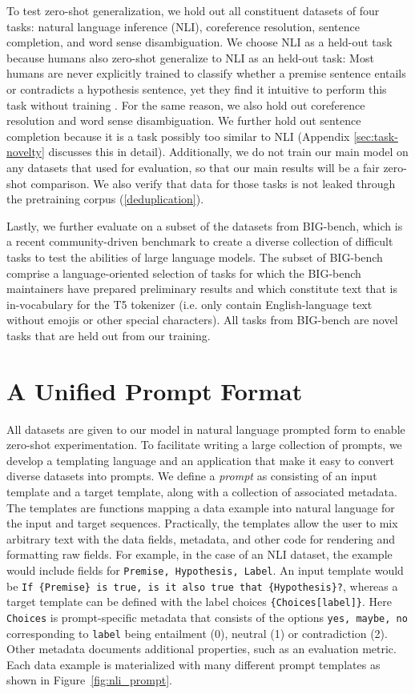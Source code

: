 To test zero-shot generalization, we hold out all constituent datasets of four tasks: natural language inference (NLI), coreference resolution, sentence completion, and word sense disambiguation. We choose NLI as a held-out task because humans also zero-shot generalize to NLI as an held-out task: Most humans are never explicitly trained to classify whether a premise sentence entails or contradicts a hypothesis sentence, yet they find it intuitive to perform this task without training \citep{williams2020anlizing}. For the same reason, we also hold out coreference resolution and word sense disambiguation. We further hold out sentence completion because it is a task possibly too similar to NLI (Appendix \ref{sec:task-novelty} discusses this in detail). Additionally, we do not train our main model on any datasets that \citet{gpt3} used for evaluation, so that our main results will be a fair zero-shot comparison. We also verify that data for those tasks is not leaked through the pretraining corpus (\autoref{deduplication}). 

Lastly, we further evaluate on a subset of the datasets from BIG-bench, which is a recent community-driven benchmark to create a diverse collection of difficult tasks to test the abilities of large language models. The subset of BIG-bench comprise a language-oriented selection of tasks for which the BIG-bench maintainers have prepared preliminary results and which constitute text that is in-vocabulary for the T5 tokenizer (i.e. only contain English-language text without emojis or other special characters). All tasks from BIG-bench are novel tasks that are held out from our training.

\section{A Unified Prompt Format} \label{sec:prompt-format}

All datasets are given to our model in natural language prompted form to enable zero-shot experimentation. To facilitate writing a large collection of prompts, we develop a templating language and an application that make it easy to convert diverse datasets into prompts. We define a \textit{prompt} as consisting of an input template and a target template, along with a collection of associated metadata. The templates are functions mapping a data example into natural language for the input and target sequences. Practically, the templates allow the user to mix arbitrary text with the data fields, metadata, and other code for rendering and formatting raw fields. For example, in the case of an NLI dataset, the example would include fields for \texttt{Premise, Hypothesis, Label}. An input template would be \texttt{If \{Premise\} is true, is it also true that \{Hypothesis\}?}, whereas a target template can be defined with the label choices \texttt{\{Choices[label]\}}. Here \texttt{Choices} is prompt-specific metadata that consists of the options \texttt{yes, maybe, no}\, corresponding to \texttt{label} being entailment (0), neutral (1) or contradiction (2). Other metadata documents additional properties, such as an evaluation metric. Each data example is materialized with many different prompt templates as shown in Figure~\ref{fig:nli_prompt}.

